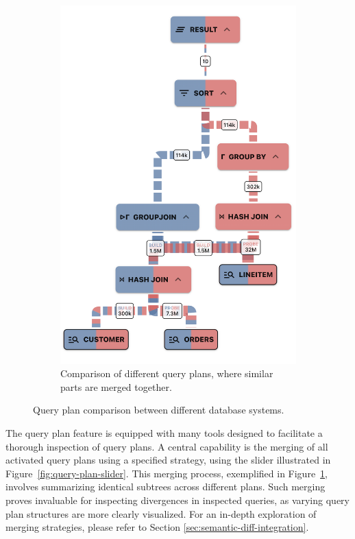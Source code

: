 \begin{figure}[h]
\begin{subfigure}[b]{0.4\linewidth}
      \includegraphics[width=\linewidth]{figures/query-plan-combined-slim.png}
      \caption{Comparison of different query plans, where similar parts are merged together.}
      \label{fig:query-plan-combined}
  \end{subfigure}
  \caption{Query plan comparison between different database systems.}
  \label{fig:query-plan}
\end{figure}


The query plan feature is equipped with many tools designed to facilitate a thorough inspection of query plans.
A central capability is the merging of all activated query plans using a specified strategy, using the slider illustrated in Figure~\ref{fig:query-plan-slider}. This merging process, exemplified in Figure~\ref{fig:query-plan-combined}, involves summarizing identical subtrees across different plans. Such merging proves invaluable for inspecting divergences in inspected queries, as varying query plan structures are more clearly visualized. For an in-depth exploration of merging strategies, please refer to Section \ref{sec:semantic-diff-integration}.



